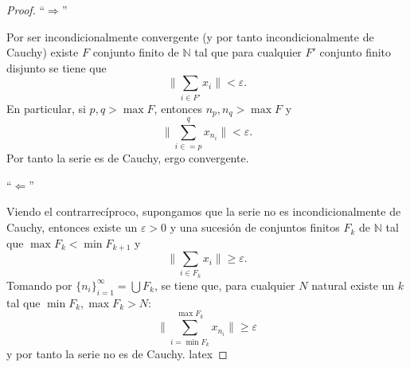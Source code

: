 		\begin{proof}
			
			\noindent ``$\Longrightarrow$''   
			
			Por ser incondicionalmente convergente (y por tanto incondicionalmente de Cauchy) existe $F$ conjunto finito de $\mathbb{N}$ tal que para cualquier $F'$ conjunto finito disjunto se tiene que 
			\[\big\| \displaystyle \sum_{i \in F'}{x_{i}}  \big\| < \varepsilon.\]
			En particular, si $p,q > \max F$, entonces $n_{p}, n_{q} > \max F$ y 
			\[\big\|  \sum_{i \in =p}^{q}{x_{n_{i}}}  \big\| < \varepsilon.\]
			Por tanto la serie es de Cauchy, ergo convergente.
			
			\noindent ``$\Longleftarrow$''
			
			Viendo el contrarrecíproco, supongamos que la serie no es incondicionalmente de Cauchy, entonces existe un $\varepsilon >0$ y una sucesión de conjuntos finitos $F_{k}$ de $\mathbb{N}$ tal que $\max F_{k} < \min F_{k+1}$ y 
			\[ \big\| \sum_{i \in F_{k}}{x_{i}}  \big\| \geq \varepsilon.\]
			Tomando por $\{ n_{i} \}_{i=1}^{\infty} = \bigcup F_{k}$, se tiene que, para  cualquier $N$ natural existe un $k$ tal que $\min F_{k}, \max F_{k} > N$:
			\[\big\| \sum_{i = \min F_{k}}^{\max F_{k}}{x_{n_{i}}}  \big\| \geq \varepsilon\]
			y por tanto la serie no es de Cauchy. \gls{latex}
			
		\end{proof}
	
	
	
		
		
			
			
